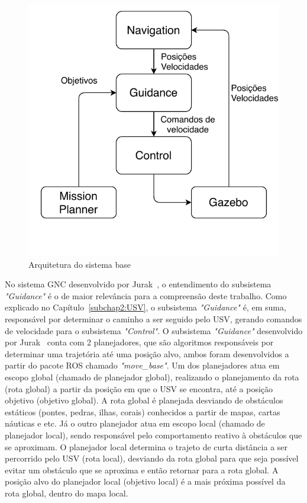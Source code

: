         \begin{figure}
            \centering
            \includegraphics{fig/chap2/arquitetura_base.pdf}
            \caption{Arquitetura do sistema base}
            \label{fig:chap2_arquitetura_base}
        \end{figure}
        
        No sistema GNC desenvolvido por Jurak~\cite{Jurak2020COLREGS}, o entendimento do subsistema \textit{"Guidance"} é o de maior relevância para a compreensão deste trabalho. Como explicado no Capítulo~\ref{subchap2:USV}, o subsistema \textit{"Guidance"} é, em suma, responsável por determinar o caminho a ser seguido pelo USV, gerando comandos de velocidade para o subsistema \textit{"Control"}. O subsistema \textit{"Guidance"} desenvolvido por Jurak~\cite{Jurak2020COLREGS} conta com 2 planejadores, que são algoritmos responsáveis por determinar uma trajetória até uma posição alvo, ambos foram desenvolvidos a partir do pacote ROS chamado \textit{"move\_base"}. Um dos planejadores atua em escopo global (chamado de planejador global), realizando o planejamento da rota (rota global) a partir da posição em que o USV se encontra, até a posição objetivo (objetivo global). A rota global é planejada desviando de obstáculos estáticos (pontes, pedras, ilhas, corais) conhecidos a partir de mapas, cartas náuticas e etc. Já o outro planejador atua em escopo local (chamado de planejador local), sendo responsável pelo comportamento reativo à obstáculos que se aproximam. O planejador local determina o trajeto de curta 
        distância a ser percorrido pelo USV (rota local), desviando da rota global para que seja possível evitar um obstáculo que se aproxima e então retornar para a rota global. A posição alvo do planejador local (objetivo local) é a mais próxima possível da rota global, dentro do mapa local.

